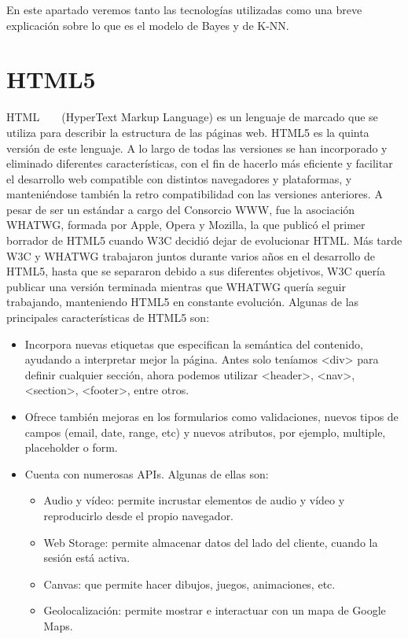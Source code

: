 \documentclass[a4paper, 12pt]{book}
\begin{document}
En este apartado veremos tanto las tecnologías utilizadas como una breve explicación sobre lo que es el modelo de Bayes y de K-NN.

\section{HTML5} 
\label{sec:html5}

HTML ~\cite{htmlw3} ~\cite{htmlwhat} (HyperText Markup Language) es un lenguaje de marcado que se utiliza para describir la estructura de las páginas web. HTML5 es la quinta versión de este lenguaje. A lo largo de todas las versiones se han incorporado y eliminado diferentes características, con el fin de hacerlo más eficiente y facilitar el desarrollo web compatible con distintos navegadores y plataformas, y manteniéndose también la retro compatibilidad con las versiones anteriores.
A pesar de ser un estándar a cargo del Consorcio WWW, fue la asociación WHATWG, formada por Apple, Opera y Mozilla, la que publicó el primer borrador de HTML5 cuando W3C decidió dejar de evolucionar HTML. Más tarde W3C y WHATWG trabajaron juntos durante varios años en el desarrollo de HTML5, hasta que se separaron debido a sus diferentes objetivos, W3C quería publicar una versión terminada mientras que WHATWG quería seguir trabajando, manteniendo HTML5 en constante evolución.
Algunas de las principales características de HTML5 son:
\begin{itemize}
	\item Incorpora nuevas etiquetas que especifican la semántica del contenido, ayudando a interpretar mejor la página. Antes solo teníamos \textless{}div\textgreater{} para definir cualquier sección, ahora podemos utilizar \textless{}header\textgreater{}, \textless{}nav\textgreater{}, \textless{}section\textgreater{}, \textless{}footer\textgreater{}, entre otros.

	\item Ofrece también mejoras en los formularios como validaciones, nuevos tipos de campos (email, date, range, etc) y nuevos atributos, por ejemplo, multiple, placeholder o form.

	\item Cuenta con numerosas APIs. Algunas de ellas son:

	\begin{itemize}

		\item Audio y vídeo: permite incrustar elementos de audio y vídeo y reproducirlo desde el propio navegador.

		\item Web Storage: permite almacenar datos del lado del cliente, cuando la sesión está activa.

        	\item Canvas: que permite hacer dibujos, juegos, animaciones, etc.

		\item Geolocalización: permite mostrar e interactuar con un mapa de Google Maps.

	\end{itemize}
\end{itemize}
\end{document}

